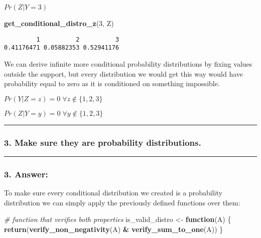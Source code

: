 \documentclass[
]{article}
\newenvironment{Shaded}{\begin{snugshade}}{\end{snugshade}}
\newcommand{\CommentTok}[1]{\textcolor[rgb]{0.56,0.35,0.01}{\textit{#1}}}
\newcommand{\ControlFlowTok}[1]{\textcolor[rgb]{0.13,0.29,0.53}{\textbf{#1}}}
\newcommand{\DecValTok}[1]{\textcolor[rgb]{0.00,0.00,0.81}{#1}}
\newcommand{\FunctionTok}[1]{\textcolor[rgb]{0.13,0.29,0.53}{\textbf{#1}}}
\newcommand{\NormalTok}[1]{#1}
\newcommand{\OtherTok}[1]{\textcolor[rgb]{0.56,0.35,0.01}{#1}}
\newcommand{\SpecialCharTok}[1]{\textcolor[rgb]{0.81,0.36,0.00}{\textbf{#1}}}
\begin{document}
\(Pr(Z | Y=3)\)

\begin{Shaded}
\begin{Highlighting}[]
\FunctionTok{get\_conditional\_distro\_z}\NormalTok{(}\DecValTok{3}\NormalTok{, Z)}
\end{Highlighting}
\end{Shaded}

\begin{verbatim}
         1          2          3 
0.41176471 0.05882353 0.52941176 
\end{verbatim}

We can derive infinite more conditional probability distributions by
fixing values outside the support, but every distribution we would get
this way would have probability equal to zero as it is conditioned on
something impossible.

\(Pr(Y | Z = z) = 0 \; \forall z \notin \{1,2,3\}\)

\(Pr(Z | Y = y) = 0 \; \forall y \notin \{1,2,3\}\)

\begin{center}\rule{0.5\linewidth}{0.5pt}\end{center}

\bigskip

\hypertarget{make-sure-they-are-probability-distributions.}{%
\subsubsection{3. Make sure they are probability
distributions.}\label{make-sure-they-are-probability-distributions.}}

\begin{center}\rule{0.5\linewidth}{0.5pt}\end{center}

\hypertarget{answer-2}{%
\subsubsection{3. Answer:}\label{answer-2}}

To make sure every conditional distribution we created is a probability
distribution we can simply apply the previously defined functions over
them:

\begin{Shaded}
\begin{Highlighting}[]
\CommentTok{\# function that verifies both properties}
\NormalTok{is\_valid\_distro }\OtherTok{\textless{}{-}} \ControlFlowTok{function}\NormalTok{(A) \{}
    \FunctionTok{return}\NormalTok{(}\FunctionTok{verify\_non\_negativity}\NormalTok{(A) }\SpecialCharTok{\&} \FunctionTok{verify\_sum\_to\_one}\NormalTok{(A))}
\NormalTok{\}}
\end{Highlighting}
\end{Shaded}
\end{document}
